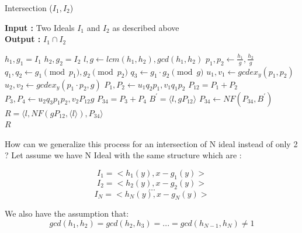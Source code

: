 \documentclass{article}
\begin{document}
\newpage
\begin{algorithm}
    \caption{Intersection ($I_{1}, I_{2}$)} \label{alg:intersect-2-ideals}
    \textbf{Input : }Two Ideals $I_{1}$ and $I_{2}$ as described above \\
    \textbf{Output : }$I_{1} \cap I_{2}$
\begin{algorithmic}
    \State $h_{1}, g_{1} = I_{1}$ 
    \State $h_{2}, g_{2} = I_{2}$ 
    \State $l, g \gets lcm(h_{1}, h_{2}), gcd(h_{1}, h_{2})$
    \State $p_{1}, p_{2} \gets \frac{h_{1}}{g}, \frac{h_{2}}{g}$
    \State $q_{1}, q_{2} \gets g_{1} \pmod {p_{1}}, g_{2} \pmod {p_{2}}$
    \State $q_{3} \gets g_{1} \cdot g_{2} \pmod {g}$ 
    \State $u_{1}, v_{1} \gets gcdex_{y} (p_{1}, p_{2})$ 
    \State $u_{2}, v_{2} \gets gcdex_{y} (p_{1} \cdot p_{2}, g)$ 
    \State $P_{1}, P_{2} \gets u_{1}q_{2}p_{1}, v_{1}q_{1}p_{2}$ 
    \State $P_{12} = P_{1} + P_{2}$
    \State $P_{3}, P_{4} \gets u_{2}q_{3}p_{1}p_{2}, v_{2}P_{12}g$
    \State $P_{34} = P_{3} + P_{4}$
    \State $B^{\prime} = \langle l, gP_{12} \rangle$
    \State $P_{34} \gets NF(P_{34}, B^{\prime})$
    \State $R = \langle l, NF(gP_{12}, \langle l \rangle), P_{34} \rangle$ \\
    \Return $R$
\end{algorithmic}
\end{algorithm}

How can we generalize this process for an intersection of N ideal instead of only 2 ?
Let assume we have N Ideal with the same structure which are : 

$$I_{1} = <h_{1}(y),x-g_{1}(y)>$$
$$I_{2} = <h_{2}(y),x-g_{2}(y)>$$
$$\dots$$
$$I_{N} = <h_{N}(y),x-g_{N}(y)>$$

We also have the assumption that: $$gcd(h_{1},h_{2})=gcd(h_{2},h_{3})=...=gcd(h_{N-1},h_{N})\neq1$$ 
\end{document}
